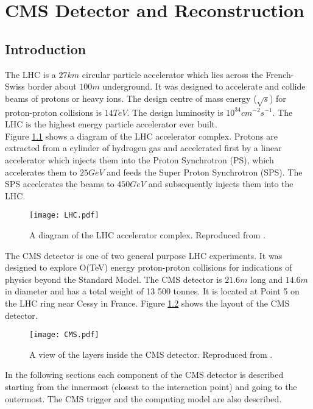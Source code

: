 \chapter{CMS Detector and Reconstruction}

\section{Introduction}

The LHC is a $27\unit{km}$ circular particle accelerator which lies across the
French-Swiss border about $100\unit{m}$ underground. It was designed to accelerate and 
collide beams of protons or heavy ions. The design centre of mass energy
($\sqrt{s}$) for proton-proton collisions is $14\unit{TeV}$. The design 
luminosity is $10^{34}\unit{cm^{-2}s^{-1}}$. The LHC is the highest energy 
particle accelerator ever built. \\

Figure \ref{fig:LHC} shows a diagram of the LHC accelerator complex. Protons are
extracted from a cylinder of hydrogen gas and accelerated first by a linear
accelerator which injects them into the Proton Synchrotron (PS), which 
accelerates them to $25\unit{GeV}$ and feeds the Super Proton Synchrotron 
(SPS). The SPS accelerates the beams to $450\unit{GeV}$ and subsequently injects 
them into the LHC. \\

\begin{figure}
\texttt{[image: LHC.pdf]}
\caption{A diagram of the LHC accelerator complex. Reproduced from
\cite{physics_tdr_1}.}
\label{fig:LHC}
\end{figure}

The CMS detector is one of two general purpose LHC experiments. It was designed 
to explore O(TeV) energy proton-proton collisions for indications of physics 
beyond the Standard Model. The CMS detector is $21.6\unit{m}$ long and 
$14.6\unit{m}$ in diameter and has a total weight of 13 500 tonnes. It is 
located at Point 5 on the LHC ring near Cessy in France. Figure \ref{fig:CMS} 
shows the layout of the CMS detector. \\

\begin{figure}
\texttt{[image: CMS.pdf]}
\caption{A view of the layers inside the CMS detector. Reproduced from
\cite{physics_tdr_1}.}
\label{fig:CMS}
\end{figure}

In the following sections each component of the CMS detector is described 
starting from the innermost (closest to the interaction point) and going to the 
outermost. The CMS trigger and the computing model are also described. 

